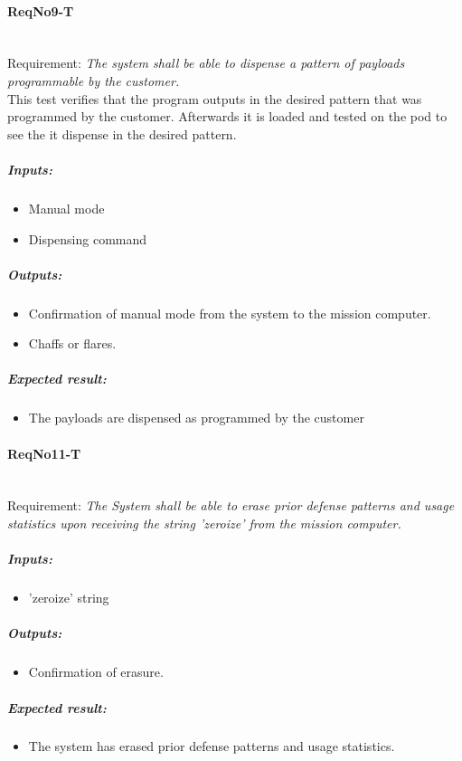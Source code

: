 \paragraph{ReqNo9-T}\mbox{}\\ %
Requirement: \textit{The system shall be able to dispense a pattern of payloads programmable by the customer.}
\\
This test verifies that the program outputs in the desired pattern that was programmed by the customer. Afterwards it is loaded and tested on the pod to see the it dispense in the desired pattern.
\\
	\subparagraph{Inputs:}
	\begin{itemize}
	\item Manual mode
	\item Dispensing command
	\end{itemize}
	\subparagraph{Outputs:}
	\begin{itemize}
	\item Confirmation of manual mode from the system to the mission computer.
	\item Chaffs or flares.
	\end{itemize}
	\subparagraph{Expected result:}
	\begin{itemize}
	\item The payloads are dispensed as programmed by the customer
	\end{itemize}


\paragraph{ReqNo11-T}\mbox{}\\ %
Requirement: \textit{The System shall be able to erase prior defense patterns and usage statistics upon receiving the string 'zeroize' from the mission computer.}\\
	\subparagraph{Inputs:}
	\begin{itemize}
	\item 'zeroize' string
	\end{itemize}
	\subparagraph{Outputs:}
	\begin{itemize}
	\item Confirmation of erasure.
	\end{itemize}
	\subparagraph{Expected result:}
	\begin{itemize}
	\item The system has erased prior defense patterns and usage statistics.
	\end{itemize}

